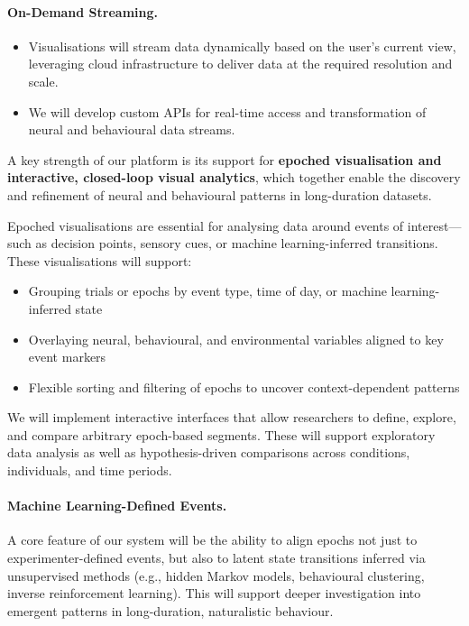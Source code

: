 \paragraph{On-Demand Streaming.}
\begin{itemize}
          \item Visualisations will stream data dynamically based on the user’s
              current view, leveraging cloud infrastructure to deliver data at
              the required resolution and scale.
                \item We will develop custom APIs for real-time access and
                    transformation of neural and behavioural data streams.
\end{itemize}

\label{sec:visEpochedInteractive}

A key strength of our platform is its support for \textbf{epoched visualisation and interactive, closed-loop visual analytics}, which together enable the discovery and refinement of neural and behavioural patterns in long-duration datasets.

Epoched visualisations are essential for analysing data around events of interest—such as decision points, sensory cues, or machine learning-inferred transitions. These visualisations will support:
\begin{itemize}
  \item Grouping trials or epochs by event type, time of day, or machine learning-inferred state
  \item Overlaying neural, behavioural, and environmental variables aligned to key event markers
  \item Flexible sorting and filtering of epochs to uncover context-dependent patterns
\end{itemize}

We will implement interactive interfaces that allow researchers to define, explore, and compare arbitrary epoch-based segments. These will support exploratory data analysis as well as hypothesis-driven comparisons across conditions, individuals, and time periods.

\paragraph{Machine Learning-Defined Events.}
A core feature of our system will be the ability to align epochs not just to experimenter-defined events, but also to latent state transitions inferred via unsupervised methods (e.g., hidden Markov models, behavioural clustering, inverse reinforcement learning). This will support deeper investigation into emergent patterns in long-duration, naturalistic behaviour.

